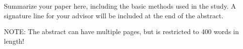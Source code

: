 \documentclass[master]{UWMThesis}
\begin{document}
\ThesisFrontmatter


\ThesisTitlepage


\begin{ThesisAbstract}
Summarize your paper here, including the basic methods used in the study.
A signature line for your advisor will be included at the end of the abstract.

NOTE: The abstract can have multiple pages, but is restricted to 400 words in length!
\end{ThesisAbstract}


\newpage
\ThesisCopyright



\end{document}
